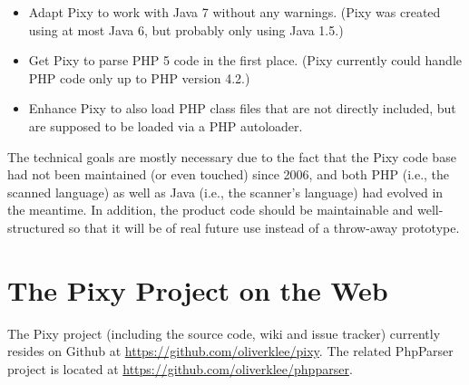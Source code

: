 \begin{itemize}
 \item Adapt Pixy to work with Java 7 without any warnings. (Pixy was created using at most Java 6, but probably only using Java 1.5.)
 \item Get Pixy to parse PHP 5 code in the first place. (Pixy currently could handle PHP code only up to PHP version 4.2.)
 \item Enhance Pixy to also load PHP class files that are not directly included, but are supposed to be loaded via a PHP autoloader.
\end{itemize}

The technical goals are mostly necessary due to the fact that the Pixy code base had not been maintained (or even touched) since 2006, and both PHP (i.e., the scanned language) as well as Java (i.e., the scanner's language) had evolved in the meantime. In addition, the product code should be maintainable and well-structured so that it will be of real future use instead of a throw-away prototype.

\section{The Pixy Project on the Web}

The Pixy project (including the source code, wiki and issue tracker) currently resides on Github at \url{https://github.com/oliverklee/pixy}. The related PhpParser project is located at \url{https://github.com/oliverklee/phpparser}.
